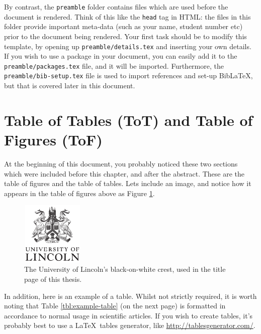 By contrast, the \texttt{preamble} folder contains files which are used before the document is rendered. Think of this like the \texttt{head} tag in HTML: the files in this folder provide important meta-data (such as your name, student number etc) prior to the document being rendered. Your first task should be to modify this template, by opening up \texttt{preamble/details.tex} and inserting your own details. If you wish to use a package in your document, you can easily add it to the \texttt{preamble/packages.tex} file, and it will be imported.  Furthermore, the \texttt{preamble/bib-setup.tex} file is used to import references and set-up Bib\LaTeX, but that is covered later in this document.


\section{Table of Tables (ToT) and Table of Figures (ToF)}
At the beginning of this document, you probably noticed these two sections which were included before this chapter, and after the abstract. These are the table of figures and the table of tables. Lets include an image, and notice how it appears in the table of figures above as Figure \ref{fig:tof-example}.

\begin{figure}[htb]
    \centering
    \includegraphics[width=3cm, height=3cm]{FHD_logo.pdf}
    \caption{The University of Lincoln's black-on-white crest, used in the title page of this thesis.}
    \label{fig:tof-example}
\end{figure}

In addition, here is an example of a table. Whilst not strictly required, it is worth noting that Table \ref{tbl:example-table} (on the next page) is formatted in accordance to normal usage in scientific articles. If you wish to create tables, it's probably best to use a \LaTeX~tables generator, like \url{http://tablesgenerator.com/}.

